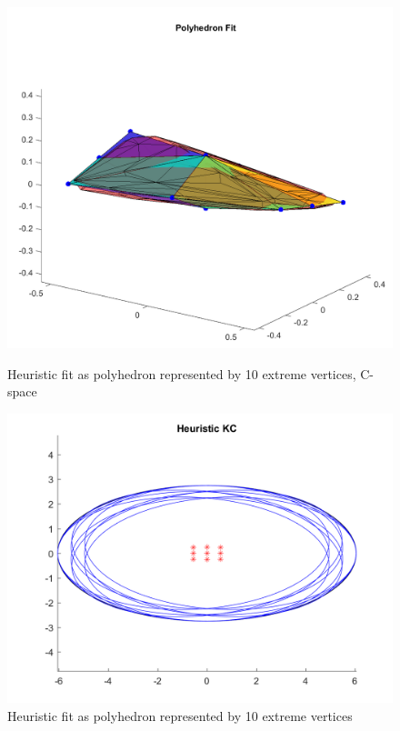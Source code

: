 \documentclass{article}
\begin{document}
\begin{figure}[t]
\centering
\begin{minipage}[b]{0.4\textwidth}
	\includegraphics[scale = 0.2]{fig/c-space-polyhedron-fit.png}
	\caption{Heuristic fit as polyhedron represented by 10 extreme vertices, C-space}
	\label{polyfit_cspace}
	\end{minipage}
	\hfill
	\begin{minipage}[b]{0.4\textwidth}
		\includegraphics[scale = 0.25]{fig/ellipses-polyhedron-fit.png}
		\caption{Heuristic fit as polyhedron represented by 10 extreme vertices}
		\label{polyfit}
		\end{minipage}
\end{figure}
\end{document}
